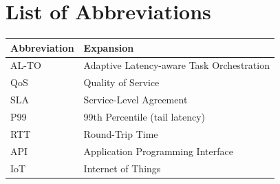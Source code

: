 \chapter*{List of Abbreviations}
\begin{center}
\renewcommand{\arraystretch}{1.3}
\begin{tabular}{ll}
\toprule
\rowcolor{bitsnavy}
{\color{white}\textbf{Abbreviation}} & {\color{white}\textbf{Expansion}} \\
\midrule
AL-TO & Adaptive Latency-aware Task Orchestration \\
QoS   & Quality of Service \\
SLA   & Service-Level Agreement \\
P99   & 99th Percentile (tail latency) \\
RTT   & Round-Trip Time \\
API   & Application Programming Interface \\
IoT   & Internet of Things \\
\bottomrule
\end{tabular}
\end{center}

\clearpage
{}
\onehalfspacing
